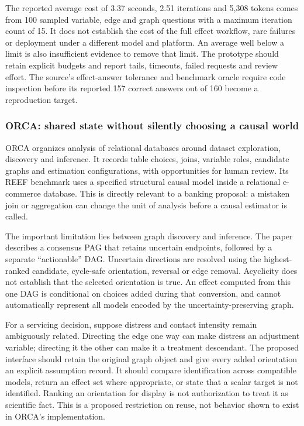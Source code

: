 The reported average cost of 3.37 seconds, 2.51 iterations and 5,308
tokens comes from 100 sampled variable, edge and graph questions with a
maximum iteration count of 15. It does not establish the cost of the
full effect workflow, rare failures or deployment under a different
model and platform. An average well below a limit is also insufficient
evidence to remove that limit. The prototype should retain explicit
budgets and report tails, timeouts, failed requests and review effort.
The source's effect-answer tolerance and benchmark oracle require code
inspection before its reported 157 correct answers out of 160 become a
reproduction target. \citep{exec13_census_causal_agent}

\hypertarget{orca-shared-state-without-silently-choosing-a-causal-world}{%
\subsubsection{ORCA: shared state without silently choosing a causal
world}\label{orca-shared-state-without-silently-choosing-a-causal-world}}

ORCA organizes analysis of relational databases around dataset
exploration, discovery and inference. It records table choices, joins,
variable roles, candidate graphs and estimation configurations, with
opportunities for human review. Its REEF benchmark uses a specified
structural causal model inside a relational e-commerce database. This is
directly relevant to a banking proposal: a mistaken join or aggregation
can change the unit of analysis before a causal estimator is called.
\citep{exec13_census_orca}

The important limitation lies between graph discovery and inference. The
paper describes a consensus PAG that retains uncertain endpoints,
followed by a separate ``actionable'' DAG. Uncertain directions are
resolved using the highest-ranked candidate, cycle-safe orientation,
reversal or edge removal. Acyclicity does not establish that the
selected orientation is true. An effect computed from this one DAG is
conditional on choices added during that conversion, and cannot
automatically represent all models encoded by the uncertainty-preserving
graph.

For a servicing decision, suppose distress and contact intensity remain
ambiguously related. Directing the edge one way can make distress an
adjustment variable; directing it the other can make it a treatment
descendant. The proposed interface should retain the original graph
object and give every added orientation an explicit assumption record.
It should compare identification across compatible models, return an
effect set where appropriate, or state that a scalar target is not
identified. Ranking an orientation for display is not authorization to
treat it as scientific fact. This is a proposed restriction on reuse,
not behavior shown to exist in ORCA's implementation.

